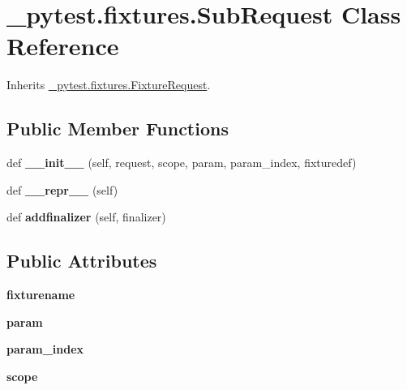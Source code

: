 \hypertarget{class__pytest_1_1fixtures_1_1_sub_request}{}\section{\+\_\+pytest.\+fixtures.\+Sub\+Request Class Reference}
\label{class__pytest_1_1fixtures_1_1_sub_request}


Inherits \hyperlink{class__pytest_1_1fixtures_1_1_fixture_request}{\+\_\+pytest.\+fixtures.\+Fixture\+Request}.

\subsection*{Public Member Functions}
\begin{DoxyCompactItemize}
\item 
\mbox{\label{class__pytest_1_1fixtures_1_1_sub_request_a57905defe3d5391b1a89fb655d18b0f8}} 
def {\bfseries \+\_\+\+\_\+init\+\_\+\+\_\+} (self, request, scope, param, param\+\_\+index, fixturedef)
\item 
\mbox{\label{class__pytest_1_1fixtures_1_1_sub_request_a648a3c09d4de85bc0e8461bb7d0e19fa}} 
def {\bfseries \+\_\+\+\_\+repr\+\_\+\+\_\+} (self)
\item 
\mbox{\label{class__pytest_1_1fixtures_1_1_sub_request_af4da571e0889e1991972f7cca00da522}} 
def {\bfseries addfinalizer} (self, finalizer)
\end{DoxyCompactItemize}
\subsection*{Public Attributes}
\begin{DoxyCompactItemize}
\item 
\mbox{\label{class__pytest_1_1fixtures_1_1_sub_request_a71c20ddde2f6708bf2161d5e30bb1b99}} 
{\bfseries fixturename}
\item 
\mbox{\label{class__pytest_1_1fixtures_1_1_sub_request_a739b4e409b204a79594f6c77a6d8a400}} 
{\bfseries param}
\item 
\mbox{\label{class__pytest_1_1fixtures_1_1_sub_request_a420a0aebd06da118d1988520010c6166}} 
{\bfseries param\+\_\+index}
\item 
\mbox{\label{class__pytest_1_1fixtures_1_1_sub_request_a12e8ec379cadc5b8989a3f30d6a38b0f}} 
{\bfseries scope}
\end{DoxyCompactItemize}


